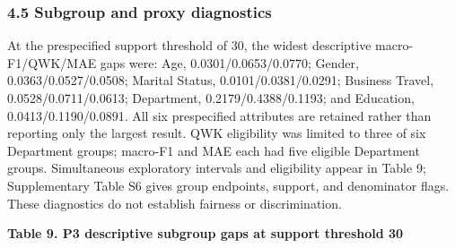 \documentclass[
  a4paper,
  review]{elsarticle}
\begin{document}
\subsubsection{4.5 Subgroup and proxy
diagnostics}\label{subgroup-and-proxy-diagnostics}

At the prespecified support threshold of 30, the widest descriptive
macro-F1/QWK/MAE gaps were: Age, 0.0301/0.0653/0.0770; Gender,
0.0363/0.0527/0.0508; Marital Status, 0.0101/0.0381/0.0291; Business
Travel, 0.0528/0.0711/0.0613; Department, 0.2179/0.4388/0.1193; and
Education, 0.0413/0.1190/0.0891. All six prespecified attributes are
retained rather than reporting only the largest result. QWK eligibility
was limited to three of six Department groups; macro-F1 and MAE each had
five eligible Department groups. Simultaneous exploratory intervals and
eligibility appear in Table 9; Supplementary Table S6 gives group
endpoints, support, and denominator flags. These diagnostics do not
establish fairness or discrimination.

\textbf{Table 9. P3 descriptive subgroup gaps at support threshold 30}
\end{document}
